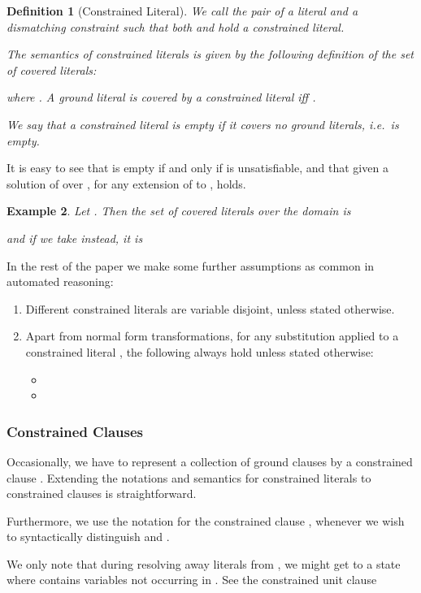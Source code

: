 \documentclass[a4paper]{article}
\newtheorem{defi}{Definition}[section]
\newtheorem{example}[defi]{Example}
\begin{document}
\begin{defi}[Constrained Literal]
We call the pair  of a literal  and a dismatching constraint  such that both
 and 
 hold
a \emph{constrained literal}.

The semantics of constrained literals is given by the following definition of the \emph{set of covered literals}:

where .
A ground literal  is \emph{covered by} a constrained literal  iff .

We say that a constrained literal  is \emph{empty} if it covers no ground literals, i.e.\
 is empty.
\end{defi}

\indent
It is easy to see that  is empty if and only if  is unsatisfiable, and that given a solution  of  over 
, for any extension  of  to , 
 holds.

\begin{example} Let .
Then the set of covered literals over the domain  is

and if we take  instead, it is

\end{example}
\noindent
In the rest of the paper we make some further assumptions as common in automated reasoning:
\begin{enumerate} 
	\item Different constrained literals are variable disjoint, unless stated otherwise.
	\item Apart from normal form transformations, for any substitution  applied to a constrained literal ,
	the following always hold unless stated otherwise:
	\begin{itemize}
		\item 
		\item 
	\end{itemize}
\end{enumerate}
\subsubsection*{Constrained Clauses}
Occasionally, we have to represent a collection of ground clauses by a constrained clause . 
Extending the notations and semantics for constrained literals to constrained clauses is straightforward. 

Furthermore, we use the notation  for the constrained clause , whenever we 
wish to syntactically distinguish  and .

We only note that during resolving away literals from , we might get to a state where 
 contains variables not occurring in . See the constrained unit clause
\end{document}
